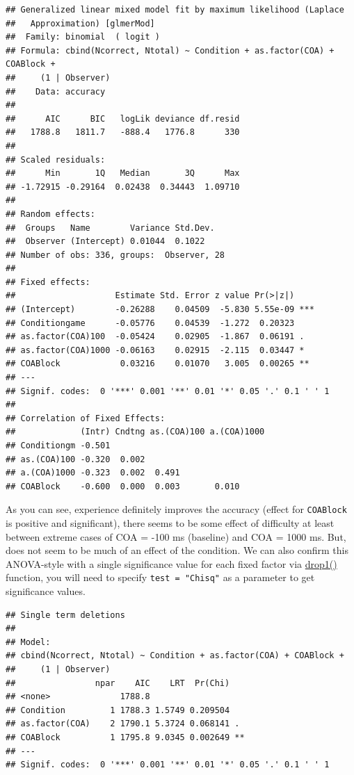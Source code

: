 \documentclass[
]{book}
\begin{document}
\begin{verbatim}
## Generalized linear mixed model fit by maximum likelihood (Laplace
##   Approximation) [glmerMod]
##  Family: binomial  ( logit )
## Formula: cbind(Ncorrect, Ntotal) ~ Condition + as.factor(COA) + COABlock +  
##     (1 | Observer)
##    Data: accuracy
## 
##      AIC      BIC   logLik deviance df.resid 
##   1788.8   1811.7   -888.4   1776.8      330 
## 
## Scaled residuals: 
##      Min       1Q   Median       3Q      Max 
## -1.72915 -0.29164  0.02438  0.34443  1.09710 
## 
## Random effects:
##  Groups   Name        Variance Std.Dev.
##  Observer (Intercept) 0.01044  0.1022  
## Number of obs: 336, groups:  Observer, 28
## 
## Fixed effects:
##                    Estimate Std. Error z value Pr(>|z|)    
## (Intercept)        -0.26288    0.04509  -5.830 5.55e-09 ***
## Conditiongame      -0.05776    0.04539  -1.272  0.20323    
## as.factor(COA)100  -0.05424    0.02905  -1.867  0.06191 .  
## as.factor(COA)1000 -0.06163    0.02915  -2.115  0.03447 *  
## COABlock            0.03216    0.01070   3.005  0.00265 ** 
## ---
## Signif. codes:  0 '***' 0.001 '**' 0.01 '*' 0.05 '.' 0.1 ' ' 1
## 
## Correlation of Fixed Effects:
##             (Intr) Cndtng as.(COA)100 a.(COA)1000
## Conditiongm -0.501                               
## as.(COA)100 -0.320  0.002                        
## a.(COA)1000 -0.323  0.002  0.491                 
## COABlock    -0.600  0.000  0.003       0.010
\end{verbatim}

As you can see, experience definitely improves the accuracy (effect for \texttt{COABlock} is positive and significant), there seems to be some effect of difficulty at least between extreme cases of COA = -100 ms (baseline) and COA = 1000 ms. But, does not seem to be much of an effect of the condition. We can also confirm this ANOVA-style with a single significance value for each fixed factor via \href{https://stat.ethz.ch/R-manual/R-devel/library/stats/html/add1.html}{drop1()} function, you will need to specify \texttt{test\ =\ "Chisq"} as a parameter to get significance values.

\begin{verbatim}
## Single term deletions
## 
## Model:
## cbind(Ncorrect, Ntotal) ~ Condition + as.factor(COA) + COABlock + 
##     (1 | Observer)
##                npar    AIC    LRT  Pr(Chi)   
## <none>              1788.8                   
## Condition         1 1788.3 1.5749 0.209504   
## as.factor(COA)    2 1790.1 5.3724 0.068141 . 
## COABlock          1 1795.8 9.0345 0.002649 **
## ---
## Signif. codes:  0 '***' 0.001 '**' 0.01 '*' 0.05 '.' 0.1 ' ' 1
\end{verbatim}
\end{document}
